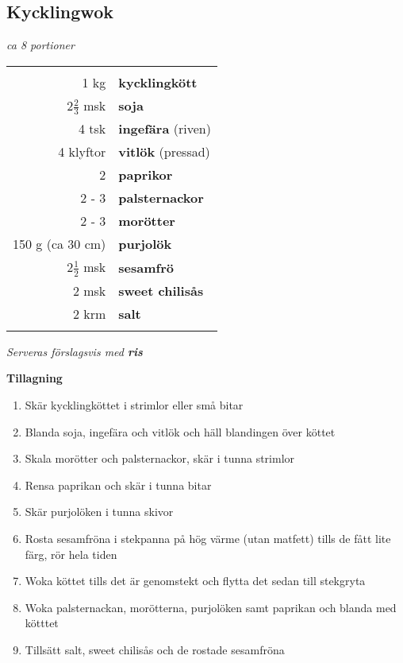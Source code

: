 \documentclass[a4paper,12pt]{article}
\newcommand{\port}[1]{\noindent \textit{#1 portioner}}
\newcommand{\tillb}[1]{\noindent \textit{Serveras förslagsvis med \textbf{#1}} \vspace{1cm}}
\begin{document}
\clearpage

\subsection{Kycklingwok}
\port{ca 8}

\begin{table}[H]
	\begin{tabular}{rl}
	\hline
	&\\
		1 kg & \textbf{kycklingkött}\\
		2$\frac{2}{3}$ msk & \textbf{soja}\\
		4 tsk & \textbf{ingefära} (riven)\\
		4 klyftor & \textbf{vitlök} (pressad)\\
		2 & \textbf{paprikor}\\
		2 - 3 & \textbf{palsternackor}\\
		2 - 3 & \textbf{morötter}\\
		150 g (ca 30 cm) & \textbf{purjolök}\\
		2$\frac{1}{2}$ msk & \textbf{sesamfrö}\\
		2 msk & \textbf{sweet chilisås}\\
		2 krm & \textbf{salt}\\
	&\\
	\hline
	\end{tabular}
\end{table}

\tillb{ris}

\begin{multicols*}{2}

\noindent \textbf{Tillagning}
\begin{enumerate}
	\itemsep0cm
	\item Skär kycklingköttet i strimlor eller små bitar
	\item Blanda soja, ingefära och vitlök och häll blandingen över köttet
	\item Skala morötter och palster\-nackor, skär i tunna strimlor
	\item Rensa paprikan och skär i \mbox{tunna} bitar
	\item Skär purjolöken i tunna skivor
	\item Rosta sesamfröna i stekpanna på hög värme (utan matfett) tills de fått lite färg, rör hela \mbox{tiden}
	\item Woka köttet tills det är genomstekt och flytta det sedan till stekgryta
	\item Woka palsternackan, \mbox{morötterna}, purjolöken samt paprikan och blanda med kötttet
	\item Tillsätt salt, sweet chilisås och de rostade sesamfröna
\end{enumerate}

\end{multicols*}
\end{document}
